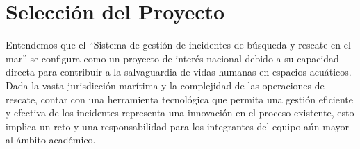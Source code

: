\section{Selección del Proyecto}\label{sec:seleccionDelProyecto}

Entendemos que el “Sistema de gestión de incidentes de búsqueda y rescate en el mar” se configura como un proyecto de 
interés nacional debido a su capacidad directa para contribuir a la salvaguardia de vidas humanas en espacios acuáticos. 
Dada la vasta jurisdicción marítima y la complejidad de las operaciones de rescate, contar con una herramienta tecnológica 
que permita una gestión eficiente y efectiva de los incidentes representa una innovación en el proceso existente, esto implica 
un reto y una responsabilidad para los integrantes del equipo aún mayor al ámbito académico. 

